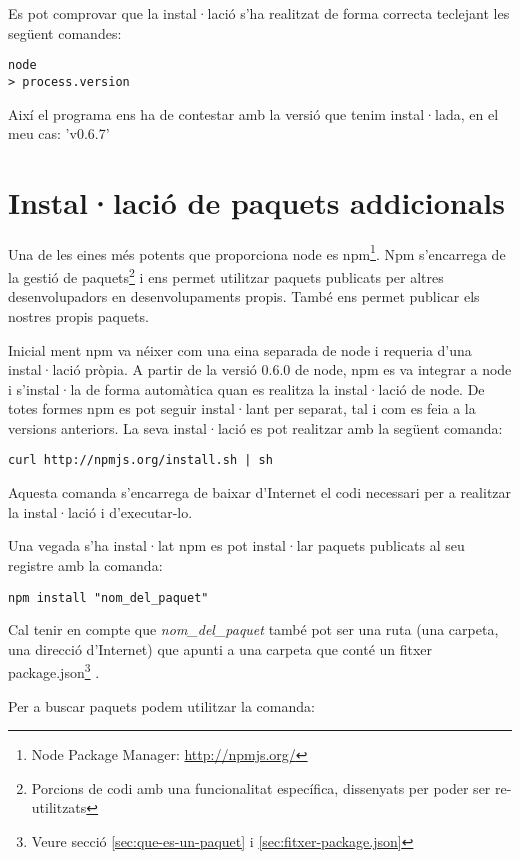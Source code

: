 Es pot comprovar que la instal·lació s'ha realitzat de forma correcta teclejant les següent comandes: 

\begin{verbatim}
node
> process.version
\end{verbatim}

Així el programa ens ha de contestar amb la versió que tenim instal·lada, en el meu cas: 'v0.6.7'

\section{Instal·lació de paquets addicionals}
\label{sec:paquets-adicionals}
Una de les eines més potents que proporciona node es npm\footnote{Node Package Manager: \url{http://npmjs.org/}}.
Npm s'encarrega de la gestió de paquets\footnote{Porcions de codi amb una funcionalitat específica, dissenyats per poder ser re-utilitzats} i ens permet utilitzar paquets publicats per altres desenvolupadors en desenvolupaments propis. També ens permet publicar els nostres propis paquets. 

Inicial ment npm va néixer com una eina separada de node i requeria d'una instal·lació pròpia. A partir de la versió 0.6.0 de node, npm es va integrar a node i s'instal·la de forma automàtica quan es realitza la instal·lació de node. De totes formes npm es pot seguir instal·lant per separat, tal i com es feia a la versions anteriors. La seva instal·lació es pot realitzar amb la següent comanda:

\begin{verbatim}
curl http://npmjs.org/install.sh | sh
\end{verbatim}

Aquesta comanda s'encarrega de baixar d'Internet el codi necessari per a realitzar la instal·lació i d'executar-lo. 

Una vegada s'ha instal·lat npm es pot instal·lar paquets publicats al seu registre amb la comanda:

\begin{verbatim}
npm install "nom_del_paquet"
\end{verbatim}

Cal tenir en compte que \emph{nom\_del\_paquet} també pot ser una ruta (una carpeta, una direcció d'Internet) que apunti a una carpeta que conté un fitxer package.json\footnote{Veure secció \ref{sec:que-es-un-paquet} i \ref{sec:fitxer-package.json}} . 

Per a buscar paquets podem utilitzar la comanda: 


